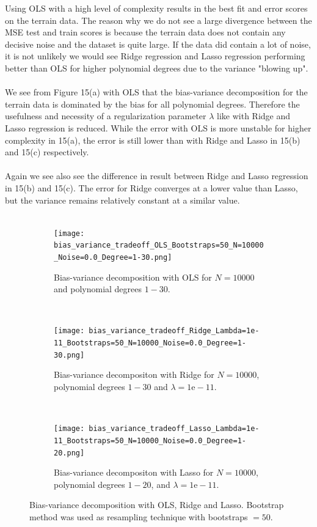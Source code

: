 \documentclass[a4paper,twocolumn]{article}
\begin{document}
Using OLS with a high level of complexity results in the best fit and error scores on the terrain data. The reason why we do not see a large divergence between the MSE test and train scores is because the terrain data does not contain any decisive noise and the dataset is quite large. If the data did contain a lot of noise, it is not unlikely we would see Ridge regression and Lasso regression performing better than OLS for higher polynomial degrees due to the variance "blowing up".\\
\\
We see from Figure 15(a) with OLS that the bias-variance decomposition for the terrain data is dominated by the bias for all polynomial degrees. Therefore the usefulness and necessity of a regularization parameter $\lambda$ like with Ridge and Lasso regression is reduced. While the error with OLS is more unstable for higher complexity in 15(a), the error is still lower than with Ridge and Lasso in 15(b) and 15(c) respectively. \\
\\
Again we see also see the difference in result between Ridge and Lasso regression in 15(b) and 15(c). The error for Ridge converges at a lower value than Lasso, but the variance remains relatively constant at a similar value.\\
\\
\begin{figure}[ht]
    \centering
    \begin{subfigure}{0.55\columnwidth}
        \centering
        \texttt{[image: bias\_variance\_tradeoff\_OLS\_Bootstraps=50\_N=10000\_Noise=0.0\_Degree=1-30.png]}
        \caption{Bias-variance decomposition with OLS for $N=10000$ and polynomial degrees $1-30$.}
    \end{subfigure}\\[1ex]
    \begin{subfigure}{0.55\columnwidth}
        \centering
        \texttt{[image: bias\_variance\_tradeoff\_Ridge\_Lambda=1e-11\_Bootstraps=50\_N=10000\_Noise=0.0\_Degree=1-30.png]}
        \caption{Bias-variance decompositon with Ridge for $N=10000$, polynomial degrees $1-30$ and $\lambda = 1\textrm{e}-11$.}
    \end{subfigure}\\[1ex]
    \begin{subfigure}{0.55\columnwidth}
        \centering
        \texttt{[image: bias\_variance\_tradeoff\_Lasso\_Lambda=1e-11\_Bootstraps=50\_N=10000\_Noise=0.0\_Degree=1-20.png]}
        \caption{Bias-variance decompositon with Lasso for $N=10000$, polynomial degrees $1-20$, and $\lambda = 1\textrm{e}-11$.}
    \end{subfigure}
    \caption{Bias-variance decomposition with OLS, Ridge and Lasso. Bootstrap method was used as resampling technique with bootstraps $=50$.}
\end{figure}\\
\end{document}
